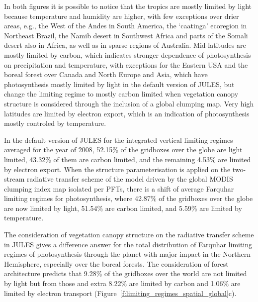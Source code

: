 In both figures it is possible to notice that the tropics are mostly limited by light because temperature and humidity are higher, with few exceptions over drier areas, e.g., the West of the Andes in South America, the `caatinga' ecoregion in Northeast Brazil, the Namib desert in Southwest Africa and parts of the Somali desert also in Africa, as well as in sparse regions of Australia. Mid-latitudes are mostly limited by carbon, which indicates stronger dependence of photosynthesis on precipitation and temperature, with exceptions for the Eastern USA and the boreal forest over Canada and North Europe and Asia, which have photosynthesis mostly limited by light in the default version of JULES, but change the limiting regime to mostly carbon limited when vegetation canopy structure is considered through the inclusion of a global clumping map. Very high latitudes are limited by electron export, which is an indication of photosynthesis mostly controled by temperature.

In the default version of JULES for the integrated vertical limiting regimes averaged for the year of 2008, 52.15\% of the gridboxes over the globe are light limited, 43.32\% of them are carbon limited, and the remaining 4.53\% are limited by electron export. When the structure parameterisation is applied on the two-stream radiative transfer scheme of the model driven by the global MODIS clumping index map \citep{He2012} isolated per PFTs, there is a shift of average Farquhar limiting regimes for photosynthesis, where 42.87\% of the gridboxes over the globe are now limited by light, 51.54\% are carbon limited, and 5.59\% are limited by temperature.

The consideration of vegetation canopy structure on the radiative transfer scheme in JULES gives a difference answer for the total distribution of Farquhar limiting regimes of photosynthesis through the planet with major impact in the Northern Hemisphere, especially over the boreal forests. The consideration of forest architecture predicts that 9.28\% of the gridboxes over the world are not limited by light but from those and extra 8.22\% are limited by carbon and 1.06\% are limited by electron transport (Figure~\ref{f:limiting_regimes_spatial_global}c).

